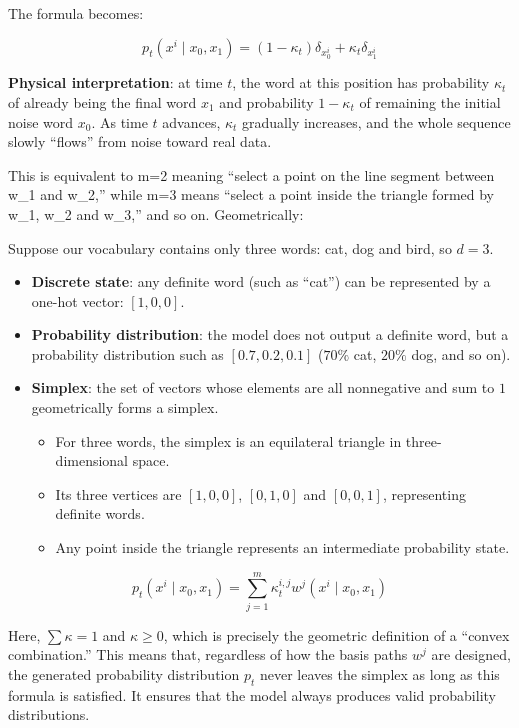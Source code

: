 The formula becomes:

\[
p_t(x^i\mid x_0,x_1)=(1-\kappa_t)\delta_{x_0^i}+\kappa_t\delta_{x_1^i}
\]

\textbf{Physical interpretation}: at time \(t\), the word at this position has probability \(\kappa_t\) of already being the final word \(x_1\) and probability \(1-\kappa_t\) of remaining the initial noise word \(x_0\). As time \(t\) advances, \(\kappa_t\) gradually increases, and the whole sequence slowly ``flows'' from noise toward real data.

This is equivalent to m=2 meaning ``select a point on the line segment between w\_1 and w\_2,'' while m=3 means ``select a point inside the triangle formed by w\_1, w\_2 and w\_3,'' and so on. Geometrically:

Suppose our vocabulary contains only three words: cat, dog and bird, so \(d=3\).

\begin{itemize}
\tightlist
\item
  \textbf{Discrete state}: any definite word (such as ``cat'') can be represented by a one-hot vector: \([1,0,0]\).
\item
  \textbf{Probability distribution}: the model does not output a definite word, but a probability distribution such as \([0.7,0.2,0.1]\) (\(70\%\) cat, \(20\%\) dog, and so on).
\item
  \textbf{Simplex}: the set of vectors whose elements are all nonnegative and sum to \(1\) geometrically forms a simplex.

  \begin{itemize}
  \tightlist
  \item
    For three words, the simplex is an equilateral triangle in three-dimensional space.
  \item
    Its three vertices are \([1,0,0]\), \([0,1,0]\) and \([0,0,1]\), representing definite words.
  \item
    Any point inside the triangle represents an intermediate probability state.
  \end{itemize}
\end{itemize}

\[
p_t(x^i\mid x_0,x_1)=\sum_{j=1}^{m}\kappa_t^{i,j}w^j(x^i\mid x_0,x_1)
\]

Here, \(\sum \kappa=1\) and \(\kappa\ge 0\), which is precisely the geometric definition of a ``convex combination.'' This means that, regardless of how the basis paths \(w^j\) are designed, the generated probability distribution \(p_t\) never leaves the simplex as long as this formula is satisfied. It ensures that the model always produces valid probability distributions.

